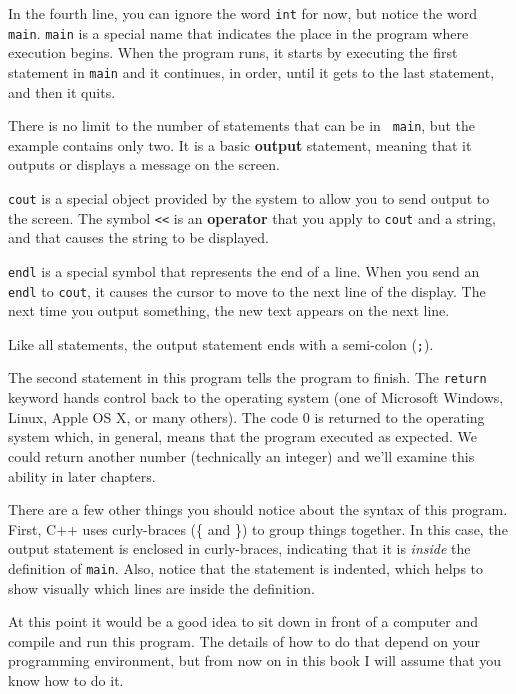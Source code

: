 In the fourth line, you can ignore the word {\tt int}
for now, but notice the word {\tt main}.  {\tt main} is a
special name that indicates the place in the program where execution
begins.  When the program runs, it starts by executing the first
statement in {\tt main} and it continues, in order, until it gets
to the last statement, and then it quits.


There is no limit to the number of statements that can be in {\tt
main}, but the example contains only two.  It is a basic {\bf
output} statement, meaning that it outputs or displays a message on
the screen.  

{\tt cout} is a special object provided by the system to allow
you to send output to the screen.  The symbol {\tt <<} is an
{\bf operator} that you apply to {\tt cout} and a string, and that
causes the string to be displayed.


{\tt endl} is a special symbol that represents the end of a
line.  When you send an {\tt endl} to {\tt cout}, it causes the
cursor to move to the next line of the display.
The next time you output something, the new text appears
on the next line.

Like all statements, the output statement ends with a
semi-colon ({\tt ;}).

The second statement in this program tells the program to finish.  The {\tt return} keyword hands control back to the operating system (one of Microsoft Windows, Linux, Apple OS X, or many others).  The code $0$ is returned to the operating system which, in general, means that the program executed as expected.  We could return another number (technically an integer) and we'll examine this ability in later chapters.

There are a few other things you should notice about the syntax of
this program.  First, C++ uses curly-braces (\{ and
\}) to group things together.  In this case, the output statement
is enclosed in curly-braces, indicating that it is {\em inside} the
definition of {\tt main}.  Also, notice that the statement is
indented, which helps to show visually which lines are inside the
definition.

At this point it would be a good idea to sit down in front of
a computer and compile and run this program.  The details of how
to do that depend on your programming environment, but from now
on in this book I will assume that you know how to do it.

